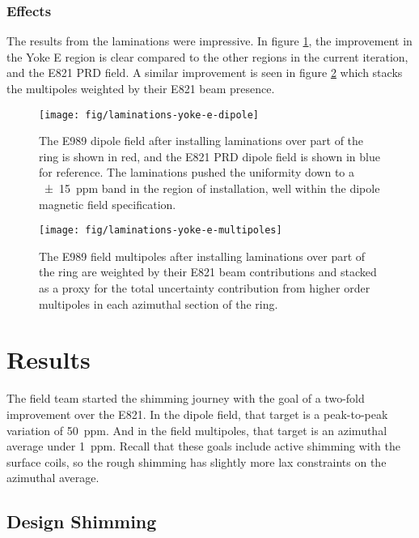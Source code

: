 \subsubsection{Effects}

The results from the laminations were impressive.  In figure \ref{fig:laminations-yoke-e-dipole}, the improvement in the Yoke E region is clear compared to the other regions in the current iteration, and the E821 PRD field.  A similar improvement is seen in figure \ref{fig:laminations-yoke-e-multipoles} which stacks the multipoles weighted by their E821 beam presence.

\begin{figure}
\centering
\texttt{[image: fig/laminations-yoke-e-dipole]}
\caption{
    The E989 dipole field after installing laminations over part of the ring is shown in red, and the E821 PRD dipole field is shown in blue for reference.  The laminations pushed the uniformity down to a \SI{\pm15}{ppm} band in the region of installation, well within the dipole magnetic field specification.
    \label{fig:laminations-yoke-e-dipole}
}
\end{figure}

\begin{figure}
\centering
\texttt{[image: fig/laminations-yoke-e-multipoles]}
\caption{
    The E989 field multipoles after installing laminations over part of the ring are weighted by their E821 beam contributions and stacked as a proxy for the total uncertainty contribution from higher order multipoles in each azimuthal section of the ring. 
    \label{fig:laminations-yoke-e-multipoles}
}
\end{figure}

\section{Results}

The field team started the shimming journey with the goal of a two-fold improvement over the E821.  In the dipole field, that target is a peak-to-peak variation of \SI{50}{ppm}. And in the field multipoles, that target is an azimuthal average under \SI{1}{ppm}.  Recall that these goals include active shimming with the surface coils, so the rough shimming has slightly more lax constraints on the azimuthal average.

\subsection{Design Shimming}

